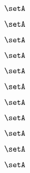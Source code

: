 \begin{forslides}
    \begin{equation}
        \label{eq:parallelism-179}
        \setA
    \end{equation}

    \begin{equation}
        \label{eq:parallelism-180}
        \setA
    \end{equation}

    \begin{equation}
        \label{eq:parallelism-181}
        \setA
    \end{equation}

    \begin{equation}
        \label{eq:parallelism-182}
        \setA
    \end{equation}

    \begin{equation}
        \label{eq:parallelism-183}
        \setA
    \end{equation}

    \begin{equation}
        \label{eq:parallelism-184}
        \setA
    \end{equation}

    \begin{equation}
        \label{eq:parallelism-185}
        \setA
    \end{equation}

    \begin{equation}
        \label{eq:parallelism-186}
        \setA
    \end{equation}

    \begin{equation}
        \label{eq:parallelism-187}
        \setA
    \end{equation}

    \begin{equation}
        \label{eq:parallelism-188}
        \setA
    \end{equation}

    \begin{equation}
        \label{eq:parallelism-189}
        \setA
    \end{equation}
    

\end{forslides}